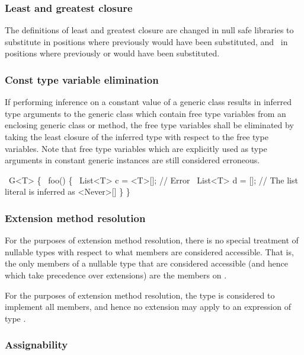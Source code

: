 \documentclass[makeidx]{article}
\begin{document}
{\subsubsection{Least and greatest closure}

The definitions of least and greatest closure are changed in null safe libraries
to substitute  in positions where previously  would have been
substituted, and \ in positions where previously  or \DYNAMIC{}
would have been substituted.

\subsubsection{Const type variable elimination}

If performing inference on a constant value of a generic class results in
inferred type arguments to the generic class which contain free type variables
from an enclosing generic class or method, the free type variables shall be
eliminated by taking the least closure of the inferred type with respect to the
free type variables.  Note that free type variables which are explicitly used as
type arguments in constant generic instances are still considered erroneous.

\begin{dartCode}
\CLASS\ G<T> \{
  \VOID\ foo() \{
    \CONST\ List<T> c = <T>[]; // Error
    \CONST\ List<T> d = []; // The list literal is inferred as <Never>[]
  \}
\}
\end{dartCode}

\subsubsection{Extension method resolution}

For the purposes of extension method resolution, there is no special treatment
of nullable types with respect to what members are considered accessible.  That
is, the only members of a nullable type that are considered accessible
(and hence which take precedence over extensions) are the members on .

For the purposes of extension method resolution, the type  is considered
to implement all members, and hence no extension may apply to an expression of
type .

\subsubsection{Assignability}

}
\end{document}
